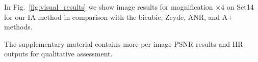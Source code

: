 \documentclass[10pt,twocolumn,letterpaper]{article}
\begin{document}
In Fig.~\ref{fig:visual_results} we show image results for magnification $\times4$ on Set14 for our IA method in comparison with the bicubic, Zeyde, ANR, and A+ methods.

The supplementary material contains more per image PSNR results and HR outputs for qualitative assessment.


\begin{figure}
\centering
\setlength{\tabcolsep}{1pt}     %
\renewcommand{\arraystretch}{0.2} %
\end{figure}
\end{document}
